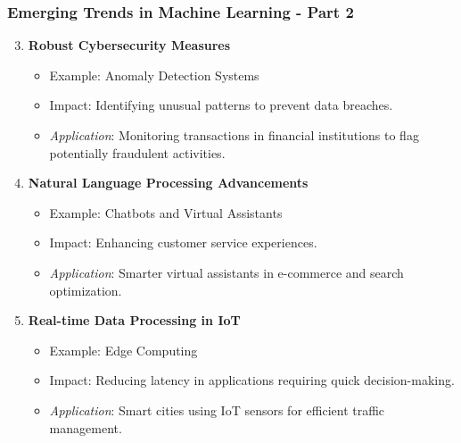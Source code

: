 \documentclass[aspectratio=169]{beamer}
\begin{document}
\begin{frame}[fragile]
    \frametitle{Emerging Trends in Machine Learning - Part 2}
    \begin{enumerate}
        \setcounter{enumi}{2} %
        \item \textbf{Robust Cybersecurity Measures}
            \begin{itemize}
                \item Example: Anomaly Detection Systems
                \item Impact: Identifying unusual patterns to prevent data breaches.
                \item \textit{Application}: Monitoring transactions in financial institutions to flag potentially fraudulent activities.
            \end{itemize}

        \item \textbf{Natural Language Processing Advancements}
            \begin{itemize}
                \item Example: Chatbots and Virtual Assistants
                \item Impact: Enhancing customer service experiences.
                \item \textit{Application}: Smarter virtual assistants in e-commerce and search optimization.
            \end{itemize}

        \item \textbf{Real-time Data Processing in IoT}
            \begin{itemize}
                \item Example: Edge Computing
                \item Impact: Reducing latency in applications requiring quick decision-making.
                \item \textit{Application}: Smart cities using IoT sensors for efficient traffic management.
            \end{itemize}
    \end{enumerate}
\end{frame}
\end{document}
